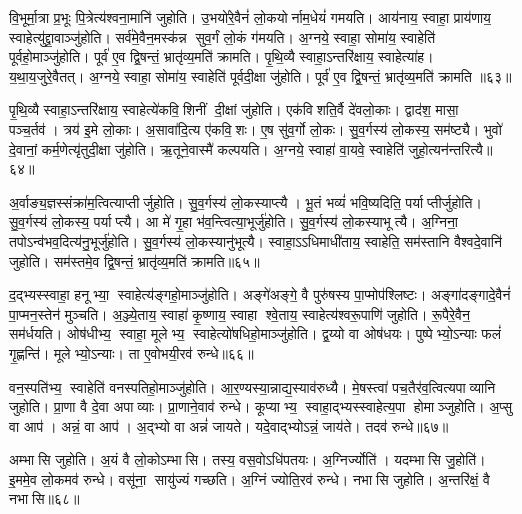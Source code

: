वि॒भूर्मा॒त्रा प्र॒भूः पि॒त्रेत्य॑श्वना॒मानि॑ जुहोति। उ॒भयो॑रे॒वैनं॑ लो॒कयोर्नाम॒धेयं॑ गमयति। आय॑नाय॒ स्वाहा॒ प्राय॑णाय॒ स्वाहेत्यु॑द्द्रा॒वाञ्जु॑होति। सर्व॑मे॒वैन॒मस्क॑न्न सुव॒र्गं लो॒कं ग॑मयति। अ॒ग्नये॒ स्वाहा॒ सोमा॑य॒ स्वाहेति॑ पूर्वहो॒माञ्जु॑होति। पूर्व॑ ए॒व द्वि॒षन्तं॒ भ्रातृ॑व्य॒मति॑ क्रामति। पृ॒थि॒व्यै स्वाहा॒ऽन्तरि॑क्षाय॒ स्वाहेत्या॑ह। य॒था॒य॒जुरे॒वैतत्। अ॒ग्नये॒ स्वाहा॒ सोमा॑य॒ स्वाहेति॑ पूर्वदी॒क्षा जु॑होति। पूर्व॑ ए॒व द्वि॒षन्तं॒ भ्रातृ॑व्य॒मति॑ क्रामति ॥६३॥

पृ॒थि॒व्यै स्वाहा॒ऽन्तरि॑क्षाय॒ स्वाहेत्ये॑कवि॒शिनीं दी॒क्षां जु॑होति। एक॑विशति॒र्वै दे॑वलो॒काः। द्वाद॑श॒ मासा॒ पञ्च॒र्तव॑। त्रय॑ इ॒मे लो॒काः। अ॒सावा॑दि॒त्य ए॑कवि॒शः। ए॒ष सु॑व॒र्गो लो॒कः। सु॒व॒र्गस्य॑ लो॒कस्य॒ सम॑ष्ट्यै। भुवो॑ दे॒वानां॒ कर्म॒णेत्यृ॑तुदी॒क्षा जु॑होति। ऋ॒तूने॒वास्मै॑ कल्पयति। अ॒ग्नये॒ स्वाहा॑ वा॒यवे॒ स्वाहेति॑ जुहो॒त्यन॑न्तरित्यै॥६४॥

अ॒र्वाङ्य॒ज्ञस्संक्रा॑म॒त्वित्याप्तीर्जुहोति। सु॒व॒र्गस्य॑ लो॒कस्याप्त्यै। भू॒तं भव्यं॑ भवि॒ष्यदिति॒ पर्याप्तीर्जुहोति। सु॒व॒र्गस्य॑ लो॒कस्य॒ पर्याप्त्यै। आ मे॑ गृ॒हा भ॑व॒न्त्वित्या॒भूर्जु॑होति। सु॒व॒र्गस्य॑ लो॒कस्याभूत्यै। अ॒ग्निना॒ तपोऽन्व॑भव॒दित्य॑नु॒भूर्जु॑होति। सु॒व॒र्गस्य॑ लो॒कस्यानु॑भूत्यै। स्वाहा॒ऽऽधिमाधी॑ताय॒ स्वाहेति॒ सम॑स्तानि वैश्वदे॒वानि॑ जुहोति। सम॑स्तमे॒व द्वि॒षन्तं॒ भ्रातृ॑व्य॒मति॑ क्रामति॥६५॥

द॒द्भ्यस्स्वाहा॒ हनूभ्या॒ स्वाहेत्य॑ङ्गहो॒माञ्जु॑होति। अङ्गे॑अङ्गे॒ वै पुरु॑षस्य पा॒प्मोप॑श्लिष्टः। अङ्गा॑दङ्गादे॒वैनं॑ पा॒प्मन॒स्तेन॑ मुञ्चति। अ॒ञ्ज्ये॒ताय॒ स्वाहा॑ कृ॒ष्णाय॒ स्वाहा श्वे॒ताय॒ स्वाहेत्य॑श्वरू॒पाणि॑ जुहोति। रू॒पैरे॒वैन॒ सम॑र्धयति। ओष॑धीभ्य॒ स्वाहा॒ मूलेभ्य॒ स्वाहेत्यो॑षधिहो॒माञ्जु॑होति। द्व॒य्यो वा ओष॑धयः। पुष्पेभ्यो॒ऽन्याः फलं॑ गृ॒ह्णन्ति॑। मूलेभ्यो॒ऽन्याः। ता ए॒वोभयी॒रव॑ रुन्धे॥६६॥

वन॒स्पति॑भ्य॒ स्वाहेति॑ वनस्पतिहो॒माञ्जु॑होति। आ॒र॒ण्यस्या॒न्नाद्य॒स्याव॑रुध्यै। मे॒षस्त्वा॑ पच॒तैर॑व॒त्वित्यपाव्यानि जुहोति। प्रा॒णा वै दे॒वा अपाव्याः। प्रा॒णाने॒वाव॑ रुन्धे। कूप्याभ्य॒ स्वाहा॒द्भ्यस्स्वाहेत्य॒पा होमाञ्जुहोति। अ॒प्सु वा आप॑। अन्नं॒ वा आप॑। अ॒द्भ्यो वा अन्नं॑ जायते। यदे॒वाद्भ्योऽन्नं॒ जाय॑ते। तदव॑ रुन्धे॥६७॥\anuvakamend[पू॒र्व॒दी॒क्षा जु॑होति॒ पूर्व॑ ए॒व द्वि॒षन्तं॒ भ्रातृ॑व्य॒मति॑ क्राम॒त्यन॑न्तरित्यै क्रामति रुन्धे॒ जाय॑त॒ एकं॑ च]

अम्भासि जुहोति। अ॒यं वै लो॒कोऽम्भासि। तस्य॒ वस॒वोऽधि॑पतयः। अ॒ग्निर्ज्योति॑। यदम्भासि जु॒होति॑। इ॒ममे॒व लो॒कमव॑ रुन्धे। वसू॑ना॒ सायु॑ज्यं गच्छति। अ॒ग्निं ज्योति॒रव॑ रुन्धे। नभासि जुहोति। अ॒न्तरि॑क्षं॒ वै नभासि॥६८॥

